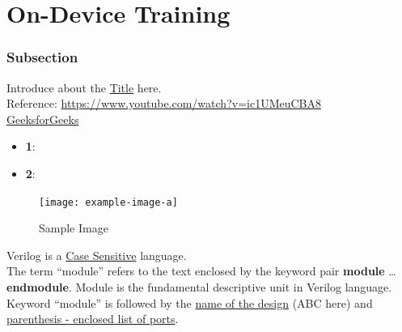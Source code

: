 \documentclass[12pt, a4paper]{article}
\begin{document}
\section{On-Device Training}

\subsubsection{Subsection}

Introduce about the \underline{Title} here. \\

Reference: \url{https://www.youtube.com/watch?v=ic1UMeuCBA8} \\
\href{https://www.geeksforgeeks.org/difference-between-gate-level-and-structural-verilog-hdl/}{GeeksforGeeks}

\begin{itemize}
    \item \textbf{1}: 
    \item \textbf{2}:
\end{itemize}

\begin{figure}[h]   %
    \centering
    \texttt{[image: example-image-a]} %
    \caption{Sample Image}%
    \label{fig:veri1}
\end{figure}

Verilog is a \underline{Case Sensitive} language. \\
The term ``module'' refers to the text enclosed by the keyword pair \textbf{module} \ldots \textbf{endmodule}. Module is the fundamental descriptive unit in Verilog language. \\
Keyword ``module'' is followed by the \underline{name of the design} (ABC here) and \uline{parenthesis - enclosed list of ports}.\\
\end{document}
